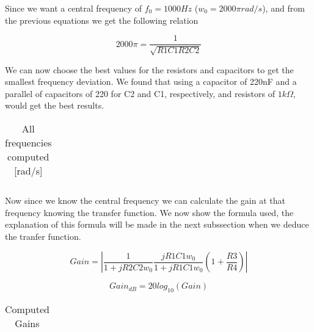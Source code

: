 \par Since we want a central frequency of $f_0 = 1000 Hz$ ($w_0 = 2000\pi rad/s$), and from the previous equations we get the following relation

\begin{equation}
	2000\pi = \frac{1}{\sqrt{R1C1R2C2}}
\end{equation}

\par We can now choose the best values for the resistors and capacitors to get the smallest frequency deviation. We found that using a capacitor of 220nF and a parallel of capacitors of 220 for C2 and C1, respectively, and resistors of $1k\Omega$, would get the best results.

\vspace{5mm}
\begin{table}[H]
	\centering
	\begin{tabularx}{0.9\textwidth} {
 	    | >{\raggedright\arraybackslash}X
  	    | >{\raggedleft\arraybackslash}X | }
	\hline
	
	\end{tabularx}
	\caption{All frequencies computed [rad/s]}
	\label{tab:currents}
\end{table}
\vspace{5mm}

\par Now since we know the central frequency we can calculate the gain at that frequency knowing the transfer function. We now show the formula used, the explanation of this formula will be made in the next subssection when we deduce the tranfer function.

\begin{equation}
	Gain = |\frac{1}{1 + j R2 C2 w_0} \frac{j R1 C1 w_0}{1 + j R1 C1 w_0} (1 + \frac{R3}{R4})| 
\end{equation}

\begin{equation}
	Gain_{dB} = 20 log_{10}(Gain)
\end{equation}

\vspace{5mm}
\begin{table}[H]
	\centering
	\begin{tabularx}{0.9\textwidth} {
 	    | >{\raggedright\arraybackslash}X
  	    | >{\raggedleft\arraybackslash}X | }
	\hline
	
	\end{tabularx}
	\caption{Computed Gains}
	\label{tab:currents}
\end{table}
\vspace{5mm}
 
